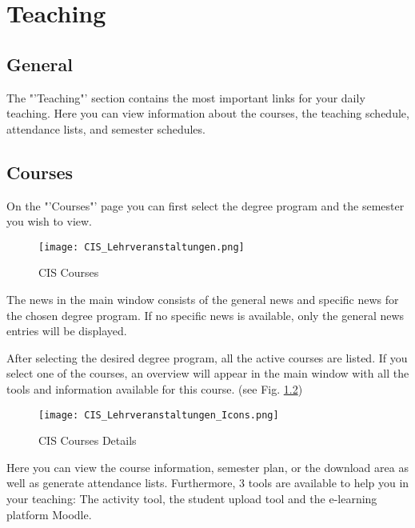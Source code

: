 \chapter{Teaching}
\label{lehre}
\section{General}

The "'Teaching"' section contains the most important links for your daily teaching.
Here you can view information about the courses, the teaching schedule, attendance lists, and semester schedules.

\section{Courses}
\label{lehre_lehrveranstaltungen}

On the "'Courses"' page you can first select the degree program and the semester you wish to view.

\begin{figure}
	\centering
	\texttt{[image: CIS\_Lehrveranstaltungen.png]}
	\caption{CIS Courses}
	\label{CIS_lehrveranstaltungen}
\end{figure}

The news in the main window consists of the general news and specific news for the chosen degree program. If no specific news is available, only the general news entries will be displayed.

After selecting the desired degree program, all the active courses are listed.
If you select one of the courses, an overview will appear in the main window with all the tools and information available for this course. (see Fig. \ref{CIS_lehrveranstaltungen})

\begin{figure}
	\centering
	\texttt{[image: CIS\_Lehrveranstaltungen\_Icons.png]}
	\caption{CIS Courses Details}
	\label{CIS_lehrveranstaltungen}
\end{figure}

Here you can view the course information, semester plan, or the download area as well as generate attendance lists.
Furthermore, 3 tools are available to help you in your teaching: The activity tool, the student upload tool and the e-learning platform Moodle.

